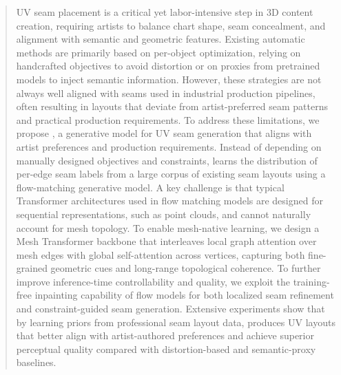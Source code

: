 \begin{abstract}
UV seam placement is a critical yet labor-intensive step in 3D content creation, requiring artists to balance chart shape, seam concealment, and alignment with semantic and geometric features. Existing automatic methods are primarily based on per-object optimization, relying on handcrafted objectives to avoid distortion or on proxies from pretrained models to inject semantic information. However, these strategies are not always well aligned with seams used in industrial production pipelines, often resulting in layouts that deviate from artist-preferred seam patterns and practical production requirements. 
To address these limitations, we propose \textit{\methodname{}}, a generative model for UV seam generation that aligns with artist preferences and production requirements. 
Instead of depending on manually designed objectives and constraints, \methodname{} learns the distribution of per-edge seam labels from a large corpus of existing seam layouts using a flow-matching generative model.
A key challenge is that typical Transformer architectures used in flow matching models are designed for sequential representations, such as point clouds, and cannot naturally account for mesh topology. To enable mesh-native learning, we design a Mesh Transformer backbone that interleaves local graph attention over mesh edges with global self-attention across vertices, capturing both fine-grained geometric cues and long-range topological coherence. 
To further improve inference-time controllability and quality, we exploit the training-free inpainting capability of flow models for both localized seam refinement and constraint-guided seam generation.
Extensive experiments show that by learning priors from professional seam layout data, \methodname{} produces UV layouts that better align with artist-authored preferences and achieve superior perceptual quality compared with distortion-based and semantic-proxy baselines.
\end{abstract}